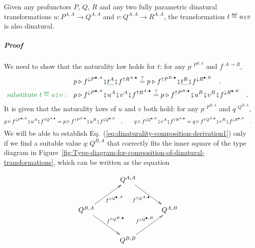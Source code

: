 Given any profunctors $P$, $Q$, $R$ and any two fully parametric
dinatural transformations $u:P^{A,A}\rightarrow Q^{A,A}$ and $v:Q^{A,A}\rightarrow R^{A,A}$,
the transformation $t\triangleq u\bef v$ is also dinatural.

\subparagraph{Proof}

We need to show that the naturality law holds for $t$: for any $p^{:P^{B,A}}$
and $f^{:A\rightarrow B}$,
\begin{align}
 & p\triangleright f^{\downarrow P^{\bullet,A}}\bef\gunderline{t^{A}}\bef f^{\uparrow R^{A,\bullet}}\overset{?}{=}p\triangleright f^{\uparrow P^{B,\bullet}}\bef\gunderline{t^{B}}\bef f^{\downarrow R^{\bullet,B}}\quad.\nonumber \\
{\color{greenunder}\text{substitute }t\triangleq u\bef v:}\quad & p\triangleright f^{\downarrow P^{\bullet,A}}\bef u^{A}\bef v^{A}\bef f^{\uparrow R^{A,\bullet}}\overset{?}{=}p\triangleright f^{\uparrow P^{B,\bullet}}\bef u^{B}\bef v^{B}\bef f^{\downarrow R^{\bullet,B}}\quad.\label{eq:dinaturality-composition-derivation1}
\end{align}
It is given that the naturality laws of $u$ and $v$ both hold: for
any $p^{:P^{B,A}}$ and $q^{:Q^{B,A}}$,
\[
p\triangleright f^{\downarrow P^{\bullet,A}}\bef u^{A}\bef f^{\uparrow Q^{A,\bullet}}=p\triangleright f^{\uparrow P^{B,\bullet}}\bef u^{B}\bef f^{\downarrow Q^{\bullet,B}}\quad,\quad\quad q\triangleright f^{\downarrow Q^{\bullet,A}}\bef v^{A}\bef f^{\uparrow R^{A,\bullet}}=q\triangleright f^{\uparrow Q^{B,\bullet}}\bef v^{B}\bef f^{\downarrow R^{\bullet,B}}\quad.
\]
We will be able to establish Eq.~(\ref{eq:dinaturality-composition-derivation1})
only if we find a suitable value $q:Q^{B,A}$ that correctly fits
the inner square of the type diagram in Figure~\ref{fig:Type-diagram-for-composition-of-dinatural-transformations},
which can be written as the equation

\begin{wrapfigure}{l}{0.32\columnwidth}%
\vspace{-1.6\baselineskip}
\[
\xymatrix{\xyScaleY{2.3pc}\xyScaleX{2.6pc} & Q^{A,A}\ar[rd]\sb(0.45){f^{\uparrow Q^{A,\bullet}}\negthickspace\negthickspace}\\
Q^{B,A}\ar[ru]\sb(0.55){\negthickspace\negthickspace f^{\downarrow Q^{\bullet,A}}}\ar[rd]\sp(0.5){f^{\uparrow Q^{B,\bullet}}\negthickspace\negthickspace} &  & Q^{A,B}\\
 & Q^{B,B}\ar[ru]\sp(0.5){f^{\downarrow Q^{\bullet,B}}\negthickspace\negthickspace\negthickspace}
}
\]

\vspace{-1.6\baselineskip}
\end{wrapfigure}%

